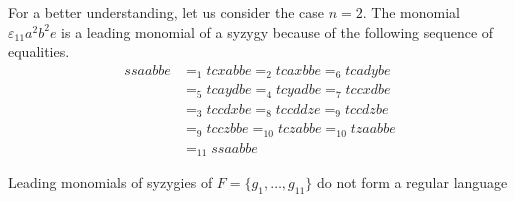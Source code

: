 \documentclass[sigconf]{acmart}
\theoremstyle{plain}
\theoremstyle{definition}
\theoremstyle{remark}
\begin{document}
For a better understanding, let us consider the case $n=2$. The monomial $\varepsilon_{11}a^2b^2e$ is a leading monomial of a syzygy because of the following sequence of equalities.
\begin{align*}
ssaabbe & =_{1} tcxabbe =_{2} tcaxbbe =_{6} tcadybe \\
& =_{5} tcaydbe =_{4} tcyadbe =_{7} tccxdbe \\
& =_{3} tccdxbe =_{8} tccddze =_{9} tccdzbe \\
& =_{9} tcczbbe =_{10} tczabbe =_{10} tzaabbe \\
& =_{11} ssaabbe
\end{align*}


\begin{proposition}
  Leading monomials of syzygies of $F=\{g_1,\dots,g_{11}\}$ do not form a regular language
\end{proposition}
\end{document}
